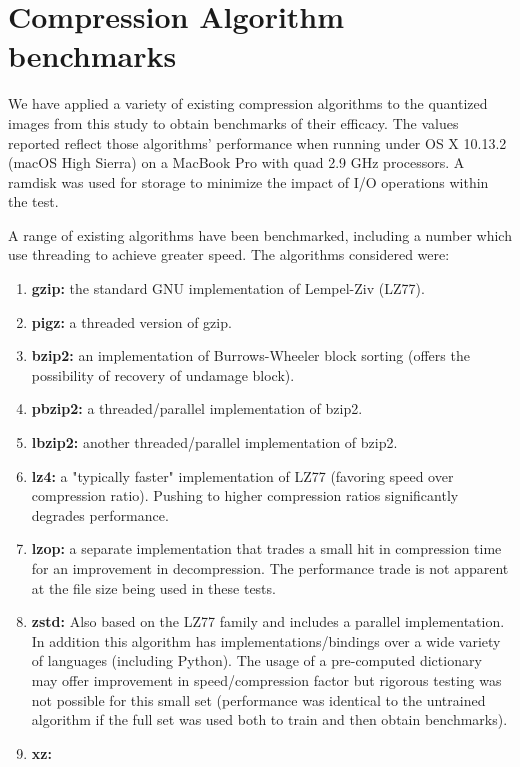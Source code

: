 \clearpage

\section{Compression Algorithm benchmarks}

We have applied a variety of existing compression algorithms to the quantized images from this study to 
obtain benchmarks of their efficacy.  The values reported reflect those algorithms' performance when
running under OS X 10.13.2 (macOS High Sierra) on a MacBook Pro with quad 2.9 GHz processors.  A ramdisk
was used for storage to minimize the impact of I/O operations within the test.  

A range of existing algorithms have been benchmarked, including a number which use threading to achieve 
greater speed.  The algorithms considered were:
\begin{enumerate}
\item {\bf gzip:} the standard GNU implementation of Lempel-Ziv (LZ77).
\item {\bf pigz:} a threaded version of gzip.
\item {\bf bzip2:} an implementation of Burrows-Wheeler block sorting (offers the possibility of recovery of undamage block).
\item {\bf pbzip2:} a threaded/parallel implementation of bzip2.
\item {\bf lbzip2:} another threaded/parallel implementation of bzip2.
\item {\bf lz4:} a "typically faster" implementation of LZ77 (favoring speed over compression ratio). Pushing to higher compression ratios significantly degrades performance.
\item {\bf lzop:} a separate implementation that trades a small hit in compression time for an improvement in decompression.  The performance trade is not apparent at the file size being used in these tests.
\item {\bf zstd:} Also based on the LZ77 family and includes a parallel implementation.  In addition this
algorithm has implementations/bindings over a wide variety of languages (including Python).  
The usage of a pre-computed dictionary may offer improvement in speed/compression factor but 
rigorous testing was not possible for this small set (performance was identical to the untrained
algorithm if the full set was used both to train and then obtain benchmarks).
\item {\bf xz:} 
\end{enumerate}

